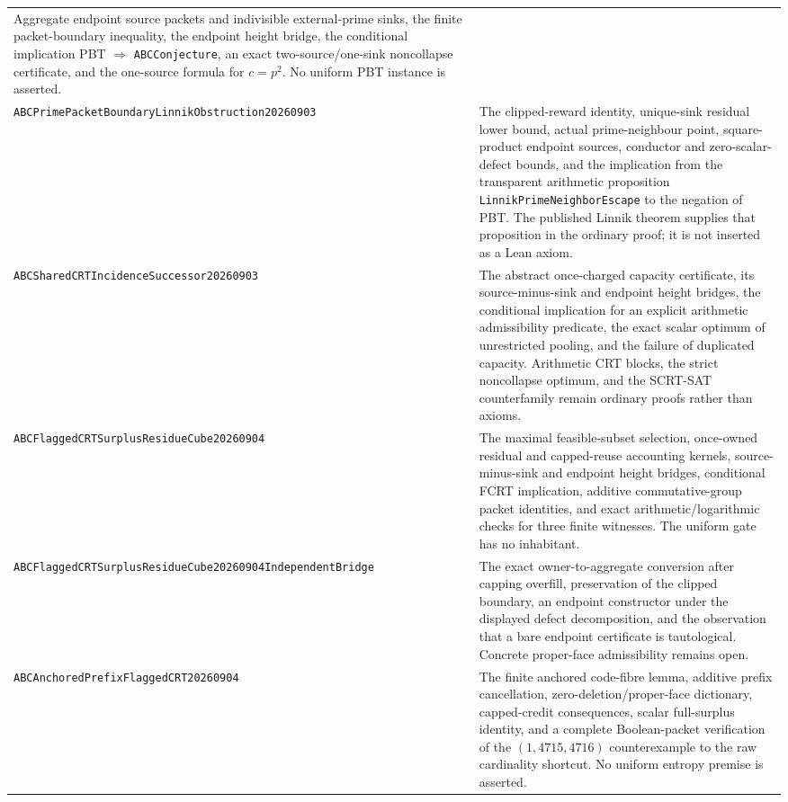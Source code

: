 \documentclass[11pt]{amsart}
\theoremstyle{definition}
\theoremstyle{remark}
\begin{document}
\begin{longtable}{>{\raggedright\arraybackslash}p{}>{\raggedright\arraybackslash}p{}}
Aggregate endpoint source packets and indivisible external-prime sinks, the
finite packet-boundary inequality, the endpoint height bridge, the
conditional implication PBT $\Rightarrow$ \texttt{ABCConjecture}, an exact
two-source/one-sink noncollapse certificate, and the one-source formula for
$c=p^2$.  No uniform PBT instance is asserted.\\[3pt]
\texttt{ABCPrimePacketBoundaryLinnik\allowbreak Obstruction20260903} &
The clipped-reward identity, unique-sink residual lower bound, actual
prime-neighbour point, square-product endpoint sources, conductor and
zero-scalar-defect bounds, and the implication from the transparent
arithmetic proposition \texttt{LinnikPrimeNeighborEscape} to the negation of
PBT.  The published Linnik theorem supplies that proposition in the ordinary
proof; it is not inserted as a Lean axiom.\\[3pt]
\texttt{ABCSharedCRTIncidence\allowbreak Successor20260903} &
The abstract once-charged capacity certificate, its source-minus-sink and
endpoint height bridges, the conditional implication for an explicit
arithmetic admissibility predicate, the exact scalar optimum of unrestricted
pooling, and the failure of duplicated capacity.  Arithmetic CRT blocks, the
strict noncollapse optimum, and the SCRT-SAT counterfamily remain ordinary
proofs rather than axioms.\\[3pt]
\texttt{ABCFlaggedCRTSurplusResidue\allowbreak Cube20260904} &
The maximal feasible-subset selection, once-owned residual and capped-reuse
accounting kernels, source-minus-sink and endpoint height bridges, conditional
FCRT implication, additive commutative-group packet identities, and exact
arithmetic/logarithmic checks for three finite witnesses.  The uniform gate
has no inhabitant.\\[3pt]
\texttt{ABCFlaggedCRTSurplusResidue\allowbreak Cube20260904IndependentBridge} &
The exact owner-to-aggregate conversion after capping overfill, preservation
of the clipped boundary, an endpoint constructor under the displayed defect
decomposition, and the observation that a bare endpoint certificate is
tautological.  Concrete proper-face admissibility remains open.\\[3pt]
\texttt{ABCAnchoredPrefixFlagged\allowbreak CRT20260904} &
The finite anchored code-fibre lemma, additive prefix cancellation,
zero-deletion/proper-face dictionary, capped-credit consequences, scalar
full-surplus identity, and a complete Boolean-packet verification of the
$(1,4715,4716)$ counterexample to the raw cardinality shortcut.  No uniform
entropy premise is asserted.\\[3pt]
\bottomrule
\end{longtable}
\end{document}
